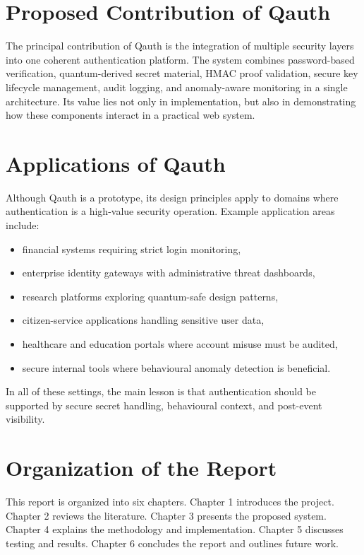 \documentclass[12pt,a4paper]{report}
\begin{document}
\section{Proposed Contribution of Qauth}
The principal contribution of Qauth is the integration of multiple security layers into one coherent authentication platform. The system combines password-based verification, quantum-derived secret material, HMAC proof validation, secure key lifecycle management, audit logging, and anomaly-aware monitoring in a single architecture. Its value lies not only in implementation, but also in demonstrating how these components interact in a practical web system.

\section{Applications of Qauth}
Although Qauth is a prototype, its design principles apply to domains where authentication is a high-value security operation. Example application areas include:

\begin{itemize}
    \item financial systems requiring strict login monitoring,
    \item enterprise identity gateways with administrative threat dashboards,
    \item research platforms exploring quantum-safe design patterns,
    \item citizen-service applications handling sensitive user data,
    \item healthcare and education portals where account misuse must be audited,
    \item secure internal tools where behavioural anomaly detection is beneficial.
\end{itemize}
In all of these settings, the main lesson is that authentication should be supported by secure secret handling, behavioural context, and post-event visibility.

\section{Organization of the Report}
This report is organized into six chapters. Chapter 1 introduces the project. Chapter 2 reviews the literature. Chapter 3 presents the proposed system. Chapter 4 explains the methodology and implementation. Chapter 5 discusses testing and results. Chapter 6 concludes the report and outlines future work.
\end{document}
